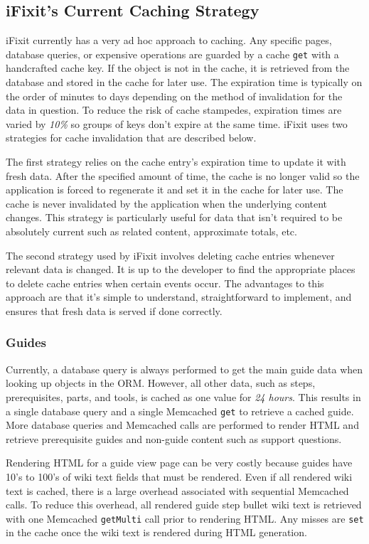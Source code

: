 \documentclass[12pt]{ucthesis}
\begin{document}
\subsection{iFixit's Current Caching Strategy}
\textsf{iFixit} currently has a very ad hoc approach to caching.
Any specific pages, database queries, or expensive operations are guarded by a cache {\tt get} with a handcrafted cache key.
If the object is not in the cache, it is retrieved from the database and stored in the cache for later use.
The expiration time is typically on the order of minutes to days depending on the method of invalidation for the data in question.
To reduce the risk of cache stampedes, expiration times are varied by \textit{10\%} so groups of keys don't expire at the same time.
\textsf{iFixit} uses two strategies for cache invalidation that are described below.

The first strategy relies on the cache entry's expiration time to update it with fresh data.
After the specified amount of time, the cache is no longer valid so the application is forced to regenerate it and set it in the cache for later use.
The cache is never invalidated by the application when the underlying content changes.
This strategy is particularly useful for data that isn't required to be absolutely current such as related content, approximate totals, etc.

The second strategy used by \textsf{iFixit} involves deleting cache entries whenever relevant data is changed.
It is up to the developer to find the appropriate places to delete cache entries when certain events occur.
The advantages to this approach are that it's simple to understand, straightforward to implement, and ensures that fresh data is served if done correctly.

\subsubsection{Guides}
Currently, a database query is always performed to get the main guide data when looking up objects in the ORM.
However, all other data, such as steps, prerequisites, parts, and tools, is cached as one value for \textit{24 hours}.
This results in a single database query and a single \textsf{Memcached} {\tt get} to retrieve a cached guide.
More database queries and \textsf{Memcached} calls are performed to render HTML and retrieve prerequisite guides and non-guide content such as support questions.

Rendering HTML for a guide view page can be very costly because guides have 10's to 100's of wiki text fields that must be rendered.
Even if all rendered wiki text is cached, there is a large overhead associated with sequential \textsf{Memcached} calls.
To reduce this overhead, all rendered guide step bullet wiki text is retrieved with one \textsf{Memcached} {\tt getMulti} call prior to rendering HTML.
Any misses are {\tt set} in the cache once the wiki text is rendered during HTML generation.
\end{document}
